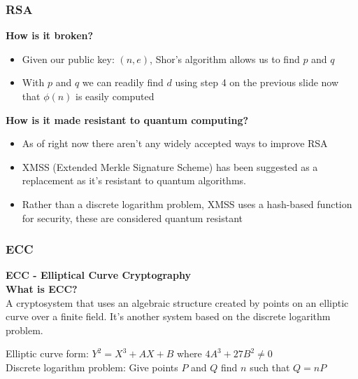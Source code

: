 \documentclass{beamer}
\begin{document}
\begin{frame}
\frametitle{RSA}
{\bf How is it broken?}\\
\begin{itemize}
    \pause
    \item Given our public key: $(n,e)$, Shor's algorithm allows us to find $p$ and $q$
    \pause
    \item With $p$ and $q$ we can readily find $d$ using step 4 on the previous slide now that $\phi(n)$ is easily computed
\end{itemize}
\vspace{0.1in}
{\bf How is it made resistant to quantum computing?}\\
\begin{itemize}
    \pause
    \item As of right now there aren't any widely accepted ways to improve
    RSA
    \pause
    \item XMSS (Extended Merkle Signature Scheme) has been suggested as a replacement as it's resistant to quantum algorithms.
    \pause
    \item Rather than a discrete logarithm problem, XMSS uses a hash-based function for security, these are considered quantum resistant
\end{itemize}
\end{frame}

\begin{frame}
\frametitle{ECC}
{\bf ECC - Elliptical Curve Cryptography}\\
{\bf What is ECC?}\\
A cryptosystem that uses an algebraic structure created by points on an elliptic curve over a finite field. It's another system based on the discrete logarithm problem.
\begin{center}
    Elliptic curve form: $Y^2=X^3+AX+B$ where $4A^3 + 27B^2 \ne 0$\\
    Discrete logarithm problem: Give points $P$ and $Q$ find $n$ such that $Q=nP$
\end{center}
\end{frame}
\end{document}
